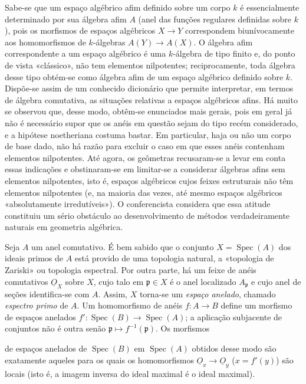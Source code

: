 \documentclass[11pt,twoside,openany]{book}
\numberwithin{equation}{section}
\newcommand{\src}[1]{%
  \phantomsection\hypertarget{src:#1}{}%
  \marginpar{\raggedleft\footnotesize\sffamily #1}%
}
\newcommand{\Osh}{\underline{O}}
\theoremstyle{plain}
\theoremstyle{definition}
\theoremstyle{remark}
\newcommand{\FgaUnitKey}{frontmatter}
\renewcommand{\src}[1]{%
  \phantomsection\hypertarget{src:\FgaUnitKey:#1}{}%
  \marginpar{\raggedleft\footnotesize\sffamily #1}%
}
\begin{document}
Sabe-se que um espaço algébrico afim definido sobre um corpo $k$ é
essencialmente determinado por sua álgebra afim $A$ (anel das funções
regulares definidas sobre $k$), pois os morfismos de espaços algébricos
$X\longrightarrow Y$ correspondem biunívocamente aos homomorfismos de
$k$-álgebras $A(Y)\longrightarrow A(X)$. O álgebra afim correspondente a um
espaço algébrico é uma $k$-álgebra de tipo finito e, do ponto de vista
«clássico», não tem elementos nilpotentes; reciprocamente, toda álgebra desse
tipo obtém-se como álgebra afim de um espaço algébrico definido sobre $k$.
Dispõe-se assim de um conhecido dicionário que permite interpretar, em termos
de álgebra comutativa, as situações relativas a espaços algébricos afins.
Há muito se observou que, desse modo, obtêm-se enunciados mais gerais, pois em
geral já não é necessário supor que os anéis em questão sejam do tipo recém
considerado, e a hipótese noetheriana costuma bastar. Em particular, haja ou
não um corpo de base dado, não há razão para excluir o caso em que esses anéis
contenham elementos nilpotentes. Até agora, os geômetras recusaram-se a levar
em conta essas indicações e obstinaram-se em limitar-se a considerar álgebras
afins sem elementos nilpotentes, isto é, espaços algébricos cujos feixes
estruturais não têm elementos nilpotentes (e, na maioria das vezes, até mesmo
espaços algébricos «absolutamente irredutíveis»). O conferencista considera que
essa atitude constituiu um sério obstáculo ao desenvolvimento de métodos
verdadeiramente naturais em geometria algébrica.

Seja $A$ um anel comutativo. É bem sabido que o conjunto
$X=\operatorname{Spec}(A)$ dos ideais primos de $A$ está provido de uma
topologia natural, a «topologia de Zariski» ou topologia espectral. Por outra
parte, há um feixe de anéis comutativos $\Osh_X$ sobre $X$, cujo talo em
$\mathfrak p\in X$ é o anel localizado $A_{\mathfrak p}$ e cujo anel de
seções identifica-se com $A$. Assim, $X$ torna-se um \emph{espaço
anelado}, chamado \emph{espectro primo} de $A$. Um homomorfismo de anéis
$f:A\longrightarrow B$ define um morfismo de espaços anelados
$f':\operatorname{Spec}(B)\longrightarrow\operatorname{Spec}(A)$; a
aplicação subjacente de conjuntos não é outra senão
$\mathfrak p\longmapsto f^{-1}(\mathfrak p)$. Os morfismos

\src{194}
de espaços anelados de $\operatorname{Spec}(B)$ em
$\operatorname{Spec}(A)$ obtidos desse modo são exatamente aqueles para
os quais os homomorfismos $\Osh_x\longrightarrow\Osh_y$ ($x=f'(y)$) são
locais (isto é, a imagem inversa do ideal maximal é o ideal maximal).
\end{document}
